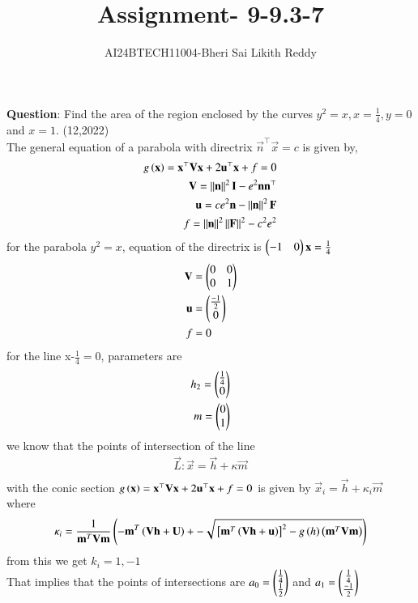 \documentclass[journal]{IEEEtran}
\begin{document}

\onecolumn
\newpage
\title{Assignment-  9-9.3-7}
\author{AI24BTECH11004-Bheri Sai Likith Reddy}
\maketitle
\textbf{Question}:
Find the area of the region enclosed by the curves $y^2=x, x=\frac{1}{4},y=0 $ and $x=1.$
\hfill{(12,2022)}\\
\solution
The general equation of a parabola with directrix $\vec{n}^{\top}\vec{x}=c$ is given by,
\begin{align}
	g\left(\mathbf{x}\right)=\mathbf{x}^{\top}\mathbf{V}\mathbf{x}+2\mathbf{u}^{\top}\mathbf{x}+f=0\\
	\mathbf{V}=\left\lVert\mathbf{n}\right\rVert^2\mathbf{I}-e^2\mathbf{n}\mathbf{n}^{\top}\\
	\mathbf{u}=ce^2\mathbf{n}-\left\lVert\mathbf{n}\right\rVert^2\mathbf{F}\\
	f=\left\lVert\mathbf{n}\right\rVert^2\left\lVert\mathbf{F}\right\rVert^2-c^2e^2
\end{align}
for the parabola $y^2=x$, equation of the directrix is $\begin{pmatrix}-1&0\end{pmatrix}\mathbf{x}=\frac{1}{4}$
\begin{align}
	\mathbf{V}&=\begin{pmatrix}0&0\\0&1\end{pmatrix}\\
	\mathbf{u}&=\begin{pmatrix}\frac{-1}{2}\\0\end{pmatrix}\\
	f&=0
\end{align}
for the line x-$\frac{1}{4}=0$, parameters are 
\begin{align}
	h_2=\begin{pmatrix}\frac{1}{4}\\ 0\end{pmatrix}\\
	m=\begin{pmatrix}0\\1\end{pmatrix}
\end{align}
we know that the points of intersection of the line 
\begin{align}
      \vec L: \vec x= \vec h +\kappa \vec m\\
\end{align}	
with the conic section $g\left(\mathbf{x}\right)=\mathbf{x}^{\top}\mathbf{V}\mathbf{x}+2\mathbf{u}^{\top}\mathbf{x}+f=0$ is given by $\vec x_i=\vec h +\kappa_i \vec m$
where $$\kappa _i=\frac{1}{\mathbf m ^T\mathbf V \mathbf m}\left(-\mathbf m^T\left(\mathbf V \mathbf h + \mathbf U\right) +- \sqrt{{}\left[\mathbf m ^T\left(\mathbf V \mathbf h +\mathbf u\right)\right]^2-g\left(h\right)\left(\mathbf m^T \mathbf V \mathbf m\right)}\right)$$
from this we get $k_i=1,-1$\\
That implies that the points of intersections are $a_0=\begin{pmatrix}\frac{1}{4}\\ \frac{1}{2}\end{pmatrix}$ and $a_1=\begin{pmatrix}\frac{1}{4}\\ \frac{-1}{2}\end{pmatrix}$\\
\end{document}
